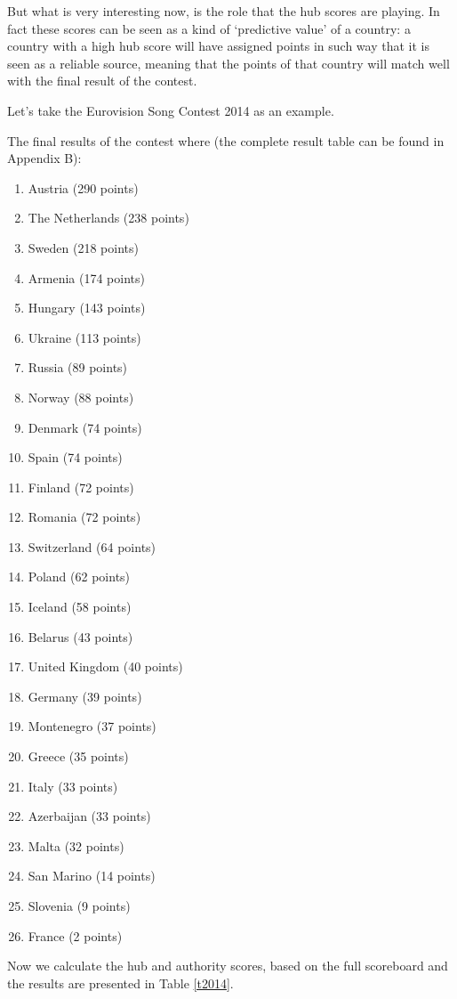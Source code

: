 \documentclass[a4paper,11pt]{report}
\begin{document}
But what is very interesting now, is the role that the hub scores are playing. 
In fact these scores can be seen as a kind of `predictive value' of a country: a 
country with a high hub score will have assigned points in such way that it is 
seen as a reliable source, meaning that the points of that country will match 
well with the final result of the contest. 

Let's take the Eurovision Song Contest 2014 as an example. 

The final results of the contest where (the complete result table can be found in Appendix 
B):
\begin{enumerate}
  \itemsep0em
\item Austria (290 points)
\item The Netherlands (238 points)
\item Sweden (218 points)
\item Armenia (174 points)
\item Hungary (143 points)
\item Ukraine (113 points)
\item Russia (89 points)
\item Norway (88 points)
\item Denmark (74 points)
\item Spain (74 points)
\item Finland (72 points)
\item Romania (72 points)
\item Switzerland (64 points)
\item Poland (62 points)
\item Iceland (58 points)
\item Belarus (43 points)
\item United Kingdom (40 points)
\item Germany (39 points)
\item Montenegro (37 points)
\item Greece (35 points)
\item Italy (33 points)
\item Azerbaijan (33 points)
\item Malta (32 points)
\item San Marino (14 points)
\item Slovenia (9 points)
\item France (2 points)
\end{enumerate}
Now we calculate the hub and authority scores, based on the full scoreboard and 
the results are presented in Table \ref{t2014}.
\end{document}

